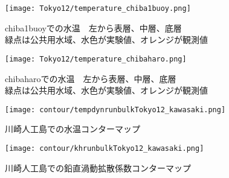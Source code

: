 \documentclass[fontsize=12pt,paper=a4]{jlreq}
\begin{document}
\begin{figure}[hbtp]
  \centering
  \texttt{[image: Tokyo12/temperature\_chiba1buoy.png]}
  \caption{chiba1buoyでの水温　左から表層、中層、底層\\緑点は公共用水域、水色が実験値、オレンジが観測値}
\end{figure}

\begin{figure}[hbtp]
  \centering
  \texttt{[image: Tokyo12/temperature\_chibaharo.png]}
  \caption{chibaharoでの水温　左から表層、中層、底層\\緑点は公共用水域、水色が実験値、オレンジが観測値}
\end{figure}


\begin{figure}[hbtp]
    \centering
    \texttt{[image: contour/tempdynrunbulkTokyo12\_kawasaki.png]}
    \caption{川崎人工島での水温コンターマップ}
\end{figure}


\begin{figure}[hbtp]
  \centering
  \texttt{[image: contour/khrunbulkTokyo12\_kawasaki.png]}
  \caption{川崎人工島での鉛直渦動拡散係数コンターマップ}
\end{figure}
\end{document}
